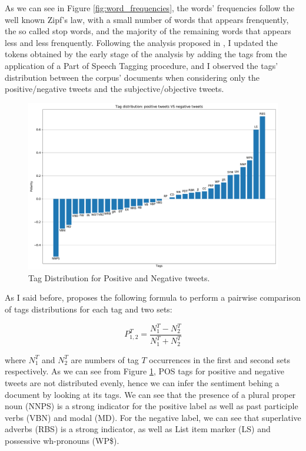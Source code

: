 \documentclass[11pt,twocolumn]{article}
\begin{document}
        \noindent
        As we can see in Figure \ref{fig:word_frequencies}, the words' frequencies follow the well known
        Zipf's law, with a small number of words that appears frenquently, the so called stop words, and the
        majority of the remaining words that appears less and less frenquently. Following the analysis
        proposed in \cite{twitter_as_a_corpus}, I updated the tokens obtained by the early stage of the
        analysis by adding the tags from the application of a Part of Speech Tagging procedure, and I
        observed the tags' distribution between the corpus' documents when considering only the
        positive/negative tweets and the subjective/objective tweets.

        \begin{figure}[h]
            \centering
            \includegraphics[width=\linewidth]{../images/tag_distribution_positive_vs_negative.pdf}
            \caption{Tag Distribution for Positive and Negative tweets.}
            \label{fig:tags_pos_vs_neg}
        \end{figure}

        \noindent
        As I said before, \cite{twitter_as_a_corpus} proposes the following formula to perform a pairwise
        comparison of tags distributions for each tag and two sets:

        \begin{equation*}
            P_{1, 2}^T = \frac{N_1^T - N_2^T}{N_1^T + N_2^T}
        \end{equation*}

        \noindent
        where $N_1^T$ and $N_2^T$ are numbers of tag $T$ occurrences in the first and second sets respectively.
        As we can see from Figure \ref{fig:tags_pos_vs_neg}, POS tags for positive and negative tweets are not
        distributed evenly, hence we can infer the sentiment behing a document by looking at its tags. We can
        see that the presence of a plural proper noun (NNPS) is a strong indicator for the positive label as
        well as past participle verbs (VBN) and modal (MD). For the negative label, we can see that superlative
        adverbs (RBS) is a strong indicator, as well as List item marker (LS) and possessive wh-pronouns (WP\$).
\end{document}
